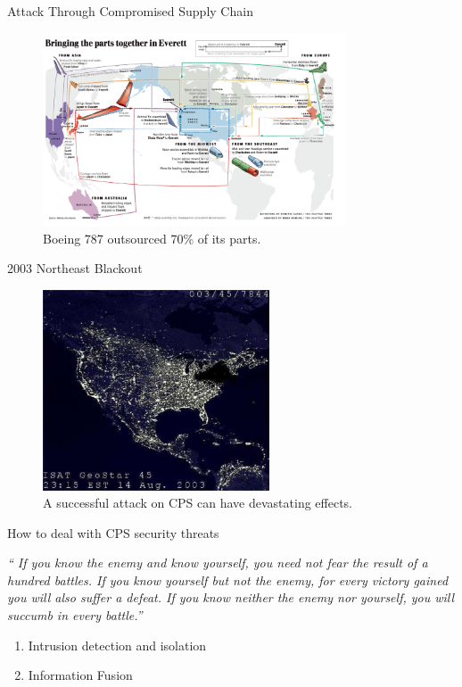 \documentclass{beamer}
\begin{document}
\begin{frame}{Attack Through Compromised Supply Chain}
  \begin{figure}[ht]
    \centering
    \includegraphics[width=0.8\textwidth]{boeing.jpg}
    \caption{Boeing 787 outsourced 70\% of its parts.}
  \end{figure}
\end{frame}

\begin{frame}{2003 Northeast Blackout}
  \begin{figure}[<+htpb+>]
    \begin{center}
      \includegraphics[width=0.60\textwidth]{blackout.jpg}
      \caption{A successful attack on CPS can have devastating effects.}
    \end{center}
  \end{figure}
\end{frame}

\begin{frame}{How to deal with CPS security threats}
  \begin{exampleblock}{}
    {\it `` If you know the enemy and know yourself, you need not fear the result of a hundred battles. If you know yourself but not the enemy, for every victory gained you will also suffer a defeat. If you know neither the enemy nor yourself, you will succumb in every battle.''}
    \vskip5mm
    \hspace*{}
  \end{exampleblock}

  \begin{enumerate}
  \item Intrusion detection and isolation
  \item Information Fusion 
  \end{enumerate}
\end{frame}
\end{document}
